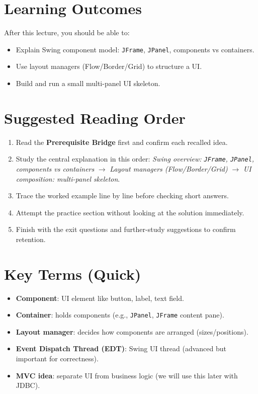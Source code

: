 \documentclass[11pt]{article}
\begin{document}
\section{Learning Outcomes}
After this lecture, you should be able to:
\begin{itemize}
  \item Explain Swing component model: \texttt{JFrame}, \texttt{JPanel}, components vs containers.
  \item Use layout managers (Flow/Border/Grid) to structure a UI.
  \item Build and run a small multi-panel UI skeleton.
\end{itemize}

\section{Suggested Reading Order}
\begin{enumerate}
  \item Read the \textbf{Prerequisite Bridge} first and confirm each recalled idea.
  \item Study the central explanation in this order: \textit{Swing overview: \texttt{JFrame}, \texttt{JPanel}, components vs containers} $\rightarrow$ \textit{Layout managers (Flow/Border/Grid)} $\rightarrow$ \textit{UI composition: multi-panel skeleton}.
  \item Trace the worked example line by line before checking short answers.
  \item Attempt the practice section without looking at the solution immediately.
  \item Finish with the exit questions and further-study suggestions to confirm retention.
\end{enumerate}
\notesources{\OOPSUnitIVSources}

\section{Key Terms (Quick)}
\begin{itemize}
  \item \textbf{Component}: UI element like button, label, text field.
  \item \textbf{Container}: holds components (e.g., \texttt{JPanel}, \texttt{JFrame} content pane).
  \item \textbf{Layout manager}: decides how components are arranged (sizes/positions).
  \item \textbf{Event Dispatch Thread (EDT)}: Swing UI thread (advanced but important for correctness).
  \item \textbf{MVC idea}: separate UI from business logic (we will use this later with JDBC).
\end{itemize}
\end{document}
